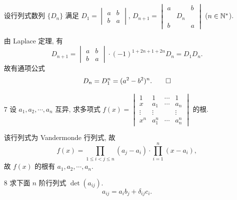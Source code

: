 \begin{solution}
    设行列式数列 \(\{D_n\}\) 满足 \(D_1=
    \begin{vmatrix}
        a & b\\
        b & a
    \end{vmatrix}
    \), \(D_{n+1}=
    \begin{vmatrix}
        a & & b\\
        & D_n &\\
        b & & a
    \end{vmatrix}
    \) (\(n\in\mathbb{N}^*\)).

    由 Laplace 定理, 有
    \[
    D_{n+1}=
    \begin{vmatrix}
        a & b\\
        b & a
    \end{vmatrix}
    \cdot(-1)^{1+2n+1+2n}D_n=D_1D_n.
    \]
    故有通项公式
    \[
    D_n=D_1^n=(a^2-b^2)^n.\qedhere
    \]
\end{solution}

\begin{ex}{7}\label{2.3.7}
    设 \(a_1,a_2,\cdots,a_n\) 互异, 求多项式 \(f(x)=
    \begin{vmatrix}
        1 & 1 & \cdots & 1\\
        x & a_1 & \cdots & a_n\\
        \vdots & \vdots & & \vdots\\
        x^n & a_1^n & \cdots & a_n^n
    \end{vmatrix}
    \) 的根.
\end{ex}

\begin{solution}
    该行列式为 Vandermonde 行列式, 故
    \[
    f(x)=\prod_{1\leq i<j\leq n}(a_j-a_i)\cdot\prod_{i=1}^n(x-a_i),
    \]
    故 \(f(x)\) 的根有 \(a_1,a_2,\cdots,a_n\).
\end{solution}

\begin{ex}{8}\label{2.3.8}
    求下面 \(n\) 阶行列式 \(\det(a_{ij})\).
    \[
    a_{ij}=a_ib_j+\delta_{ij}c_i.
    \]
\end{ex}

